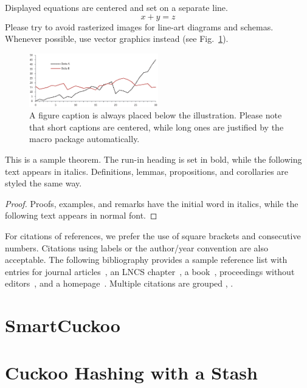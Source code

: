 \documentclass[runningheads]{llncs}
\begin{document}
\noindent Displayed equations are centered and set on a separate
line.
\begin{equation}
x + y = z
\end{equation}
Please try to avoid rasterized images for line-art diagrams and
schemas. Whenever possible, use vector graphics instead (see
Fig.~\ref{fig1}).

\begin{figure}
\includegraphics[width=0.5\textwidth]{fig1.eps}
\caption{A figure caption is always placed below the illustration.
Please note that short captions are centered, while long ones are
justified by the macro package automatically.} \label{fig1}
\end{figure}

\begin{theorem}
This is a sample theorem. The run-in heading is set in bold, while
the following text appears in italics. Definitions, lemmas,
propositions, and corollaries are styled the same way.
\end{theorem}
%
%
\begin{proof}
Proofs, examples, and remarks have the initial word in italics,
while the following text appears in normal font.
\end{proof}
For citations of references, we prefer the use of square brackets
and consecutive numbers. Citations using labels or the author/year
convention are also acceptable. The following bibliography provides
a sample reference list with entries for journal
articles~\cite{ref_article1}, an LNCS chapter~\cite{ref_lncs1}, a
book~\cite{ref_book1}, proceedings without editors~\cite{ref_proc1},
and a homepage~\cite{ref_url1}. Multiple citations are grouped
\cite{ref_article1,ref_lncs1,ref_book1},
\cite{ref_article1,ref_book1,ref_proc1,ref_url1}.

\section{SmartCuckoo}
\section{Cuckoo Hashing with a Stash}
\end{document}
